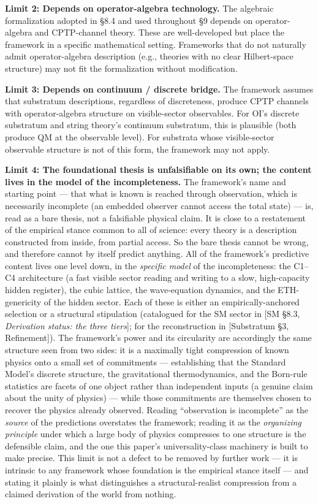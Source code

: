 \documentclass[
]{article}
\begin{document}
\textbf{Limit 2: Depends on operator-algebra technology.} The algebraic
formalization adopted in §8.4 and used throughout §9 depends on
operator-algebra and CPTP-channel theory. These are well-developed but
place the framework in a specific mathematical setting. Frameworks that
do not naturally admit operator-algebra description (e.g., theories with
no clear Hilbert-space structure) may not fit the formalization without
modification.

\textbf{Limit 3: Depends on continuum / discrete bridge.} The framework
assumes that substratum descriptions, regardless of discreteness,
produce CPTP channels with operator-algebra structure on visible-sector
observables. For OI's discrete substratum and string theory's continuum
substratum, this is plausible (both produce QM at the observable level).
For substrata whose visible-sector observable structure is not of this
form, the framework may not apply.

\textbf{Limit 4: The foundational thesis is unfalsifiable on its own;
the content lives in the model of the incompleteness.} The framework's
name and starting point --- that what is known is reached through
observation, which is necessarily incomplete (an embedded observer
cannot access the total state) --- is, read as a bare thesis, not a
falsifiable physical claim. It is close to a restatement of the
empirical stance common to all of science: every theory is a description
constructed from inside, from partial access. So the bare thesis cannot
be wrong, and therefore cannot by itself predict anything. All of the
framework's predictive content lives one level down, in the
\emph{specific model} of the incompleteness: the C1--C4 architecture (a
fast visible sector reading and writing to a slow, high-capacity hidden
register), the cubic lattice, the wave-equation dynamics, and the
ETH-genericity of the hidden sector. Each of these is either an
empirically-anchored selection or a structural stipulation (catalogued
for the SM sector in {[}SM §8.3, \emph{Derivation status: the three
tiers}{]}; for the reconstruction in {[}Substratum §3, Refinement{]}).
The framework's power and its circularity are accordingly the same
structure seen from two sides: it is a maximally tight compression of
known physics onto a small set of commitments --- establishing that the
Standard Model's discrete structure, the gravitational thermodynamics,
and the Born-rule statistics are facets of one object rather than
independent inputs (a genuine claim about the unity of physics) ---
while those commitments are themselves chosen to recover the physics
already observed. Reading ``observation is incomplete'' as the
\emph{source} of the predictions overstates the framework; reading it as
the \emph{organizing principle} under which a large body of physics
compresses to one structure is the defensible claim, and the one this
paper's universality-class machinery is built to make precise. This
limit is not a defect to be removed by further work --- it is intrinsic
to any framework whose foundation is the empirical stance itself --- and
stating it plainly is what distinguishes a structural-realist
compression from a claimed derivation of the world from nothing.
\end{document}
